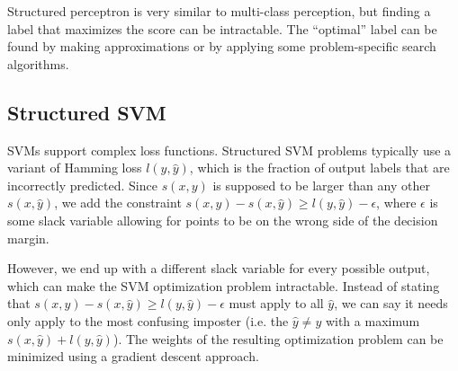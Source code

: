 \documentclass[12pt,titlepage]{article}
\begin{document}
      Structured perceptron is very similar to multi-class perception, but finding a label that maximizes the score can be intractable. The ``optimal'' label can be found by
      making approximations or by applying some problem-specific search algorithms.

    \subsection{Structured SVM}
      SVMs support complex loss functions. Structured SVM problems typically use a variant of Hamming loss $l(y, \hat{y})$, which is the fraction of output labels that are
      incorrectly predicted. Since $s(x, y)$ is supposed to be larger than any other $s(x, \hat{y})$, we add the constraint $s(x, y) - s(x, \hat{y}) \geq l(y, \hat{y}) - \epsilon$,
      where $\epsilon$ is some slack variable allowing for points to be on the wrong side of the decision margin.

      However, we end up with a different slack variable for every possible output, which can make the SVM optimization problem intractable. Instead of stating that
      $s(x, y) - s(x, \hat{y}) \geq l(y, \hat{y}) - \epsilon$ must apply to all $\hat{y}$, we can say it needs only apply to the most confusing imposter (i.e. the $\hat{y} \neq y$
      with a maximum $s(x, \hat{y}) + l(y, \hat{y})$). The weights of the resulting optimization problem can be minimized using a gradient descent approach.
\end{document}
